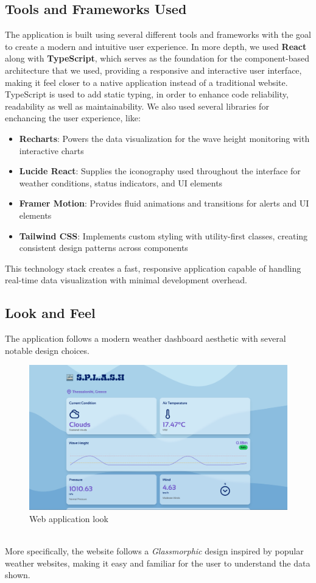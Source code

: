 \documentclass{article}
\begin{document}
\subsection{Tools and Frameworks Used}
    The application is built using several different tools and frameworks with the goal to create a modern and intuitive user experience. In more depth, we used \textbf{React} along with \textbf{TypeScript}, which serves as the foundation for the component-based architecture that we used, providing a responsive and interactive user interface, making it feel closer to a native application instead of a traditional website. TypeScript is used to add static typing, in order to enhance code reliability, readability as well as maintainability. We also used several libraries for enchancing the user experience, like:
    \begin{itemize}
        \item \textbf{Recharts}: Powers the data visualization for the wave height monitoring with interactive charts
        \item \textbf{Lucide React}: Supplies the iconography used throughout the interface for weather conditions, status indicators, and UI elements
        \item \textbf{Framer Motion}: Provides fluid animations and transitions for alerts and UI elements
        \item \textbf{Tailwind CSS}: Implements custom styling with utility-first classes, creating consistent design patterns across components
    \end{itemize}
    This technology stack creates a fast, responsive application capable of handling real-time data visualization with minimal development overhead.
        
\subsection{Look and Feel}
    The application follows a modern weather dashboard aesthetic with several notable design choices.
    \begin{figure}[h]
        \centering
        \includegraphics[width=0.75\linewidth]{assets/FE_F2.png}
        \caption{Web application look}
        \label{fig:frontend}
    \end{figure}
    \\
    More specifically, the website follows a \textit{Glassmorphic} design inspired by popular weather websites, making it easy and familiar for the user to understand the data shown.
\end{document}
